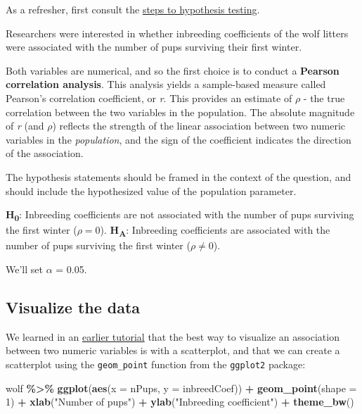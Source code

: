 \documentclass[
]{book}
\newenvironment{Shaded}{\begin{snugshade}}{\end{snugshade}}
\newcommand{\AttributeTok}[1]{\textcolor[rgb]{0.13,0.29,0.53}{#1}}
\newcommand{\DecValTok}[1]{\textcolor[rgb]{0.00,0.00,0.81}{#1}}
\newcommand{\FunctionTok}[1]{\textcolor[rgb]{0.13,0.29,0.53}{\textbf{#1}}}
\newcommand{\NormalTok}[1]{#1}
\newcommand{\SpecialCharTok}[1]{\textcolor[rgb]{0.81,0.36,0.00}{\textbf{#1}}}
\newcommand{\StringTok}[1]{\textcolor[rgb]{0.31,0.60,0.02}{#1}}
\begin{document}
As a refresher, first consult the \hyperref[hyp_steps]{steps to hypothesis testing}.

Researchers were interested in whether inbreeding coefficients of the wolf litters were associated with the number of pups surviving their first winter.

Both variables are numerical, and so the first choice is to conduct a \textbf{Pearson correlation analysis}. This analysis yields a sample-based measure called Pearson's correlation coefficient, or \emph{r}. This provides an estimate of \(\rho\) - the true correlation between the two variables in the population. The absolute magnitude of \emph{r} (and \(\rho\)) reflects the strength of the linear association between two numeric variables in the \emph{population}, and the sign of the coefficient indicates the direction of the association.

The hypothesis statements should be framed in the context of the question, and should include the hypothesized value of the population parameter.

\textbf{H\textsubscript{0}}: Inbreeding coefficients are not associated with the number of pups surviving the first winter (\(\rho = 0\)).
\textbf{H\textsubscript{A}}: Inbreeding coefficients are associated with the number of pups surviving the first winter (\(\rho \ne 0\)).

We'll set \(\alpha\) = 0.05.

\subsection{Visualize the data}\label{see_corr}

We learned in an \hyperref[two_numeric]{earlier tutorial} that the best way to visualize an association between two numeric variables is with a scatterplot, and that we can create a scatterplot using the \texttt{geom\_point} function from the \texttt{ggplot2} package:

\begin{Shaded}
\begin{Highlighting}[]
\NormalTok{wolf }\SpecialCharTok{\%\textgreater{}\%} 
\FunctionTok{ggplot}\NormalTok{(}\FunctionTok{aes}\NormalTok{(}\AttributeTok{x =}\NormalTok{ nPups, }\AttributeTok{y =}\NormalTok{ inbreedCoef)) }\SpecialCharTok{+}
  \FunctionTok{geom\_point}\NormalTok{(}\AttributeTok{shape =} \DecValTok{1}\NormalTok{) }\SpecialCharTok{+}
  \FunctionTok{xlab}\NormalTok{(}\StringTok{"Number of pups"}\NormalTok{) }\SpecialCharTok{+}
  \FunctionTok{ylab}\NormalTok{(}\StringTok{"Inbreeding coefficient"}\NormalTok{) }\SpecialCharTok{+}
  \FunctionTok{theme\_bw}\NormalTok{()}
\end{Highlighting}
\end{Shaded}
\end{document}
